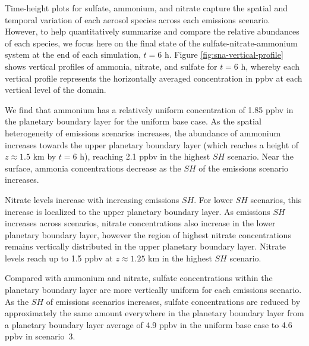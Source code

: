 Time-height plots for sulfate, ammonium, and nitrate capture the spatial and temporal variation of each aerosol species across each emissions scenario. However, to help quantitatively summarize and compare the relative abundances of each species, we focus here on the final state of the sulfate-nitrate-ammonium system at the end of each simulation, $t=6$ h. Figure \ref{fig:sna-vertical-profile} shows vertical profiles of ammonia, nitrate, and sulfate for $t=6$ h, whereby each vertical profile represents the horizontally averaged concentration in ppbv at each vertical level of the domain.

We find that ammonium has a relatively uniform concentration of 1.85 ppbv in the planetary boundary layer for the uniform base case. As the spatial heterogeneity of emissions scenarios increases, the abundance of ammonium increases towards the upper planetary boundary layer (which reaches a height of $z\approx1.5$ km by $t=6$ h), reaching 2.1 ppbv in the highest $SH$ scenario. Near the surface, ammonia concentrations decrease as the $SH$ of the emissions scenario increases. 

Nitrate levels increase with increasing emissions $SH$. For lower $SH$ scenarios, this increase is localized to the upper planetary boundary layer. As emissions $SH$ increases across scenarios, nitrate concentrations also increase in the lower planetary boundary layer, however the region of highest nitrate concentrations remains vertically distributed in the upper planetary boundary layer. Nitrate levels reach up to 1.5 ppbv at $z\approx1.25$ km in the highest $SH$ scenario.  

Compared with ammonium and nitrate, sulfate concentrations within the planetary boundary layer are more vertically uniform for each emissions scenario. As the $SH$ of emissions scenarios increases, sulfate concentrations are reduced by approximately the same amount everywhere in the planetary boundary layer from a planetary boundary layer average of 4.9 ppbv in the uniform base case to 4.6 ppbv in scenario~3. 

